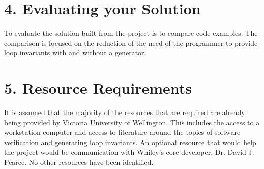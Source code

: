\documentclass[11pt, a4paper, twoside, openright]{report}
\begin{document}
\section*{4. Evaluating your Solution}



To evaluate the solution built from the project is to compare code 
examples.
The comparison is focused on the reduction of the need of the programmer 
to provide loop invariants with and without a generator.



\section*{5. Resource Requirements}


It is assumed that the majority of the resources that are required  are already being
provided by Victoria University of Wellington.
This includes the access to a workstation computer and access to literature around the
topics of software verification and generating loop invariants.
An optional resource that would help the project would be communication
with Whiley's core developer, Dr. David J. Pearce.
No other resources have been identified.



\backmatter

%


\end{document}
